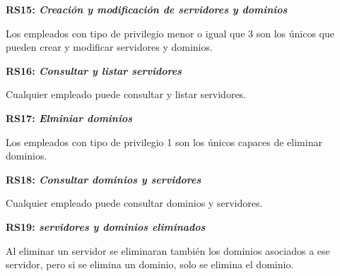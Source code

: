 \documentclass[paper=a4, fontsize=11pt, spanish]{scrartcl}
\begin{document}
\setlength{\parindent}{0em}
\textbf{RS15: \textit{Creación y modificación de servidores y dominios}}
\setlength{\parindent}{2em}

Los empleados con tipo de privilegio menor o igual que 3 son los únicos que pueden crear y modificar servidores y dominios.

\setlength{\parindent}{0em}
\textbf{RS16: \textit{Consultar y listar servidores}}
\setlength{\parindent}{2em}

Cualquier empleado puede consultar y listar servidores.

\setlength{\parindent}{0em}
\textbf{RS17: \textit{Elminiar dominios}}
\setlength{\parindent}{2em}

Los empleados con tipo de privilegio 1 son los únicos capaces de eliminar dominios.

\setlength{\parindent}{0em}
\textbf{RS18: \textit{Consultar dominios y servidores}}
\setlength{\parindent}{2em}

Cualquier empleado puede consultar dominios y servidores.

\setlength{\parindent}{0em}
\textbf{RS19: \textit{servidores y dominios eliminados}}
\setlength{\parindent}{2em}

Al eliminar un servidor se eliminaran también los dominios asociados a ese servidor, pero si se elimina un dominio, solo se elimina el dominio.
\end{document}
